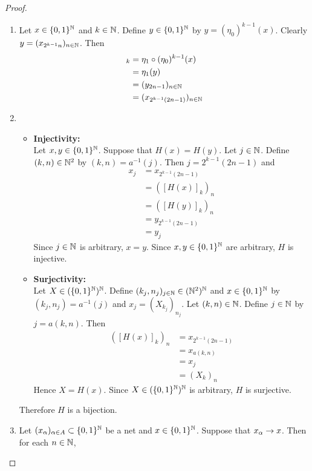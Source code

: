 \documentclass{book}
\begin{document}
	\begin{proof}\
		\begin{enumerate}
			\item Let $x \in \{0,1\}^{\mathbb{N}}$ and $k \in \mathbb{N}$. Define $y \in \{0,1\}^{\mathbb{N}}$ by $ y = (\eta_0)^{k-1}(x)$. Clearly $y = (x_{2^{k-1}n})_{n \in \mathbb{N}}$. Then 
			\begin{align*}
				[H(x)]_k
				& = \eta_1 \circ (\eta_0)^{k-1}(x) \\
				& = \eta_1(y) \\
				& = (y_{2n-1})_{n \in \N} \\
				& =  (x_{2^{k-1}(2n-1)})_{n \in \N}
			\end{align*}
			\item  
			\begin{itemize}
				\item \textbf{Injectivity:} \\
				Let $x, y \in \{0,1\}^{\mathbb{N}}$. Suppose that $H(x) = H(y)$. Let $j \in \mathbb{N}$. Define $(k,n) \in \mathbb{N}^2$ by $(k,n) = a^{-1}(j)$. Then $j = 2^{k-1}(2n-1)$ and
				\begin{align*}
					x_j
					& = x_{2^{k-1}(2n-1)} \\
					& = ([H(x)]_k)_n \\
					& = ([H(y)]_k)_n \\
					& = y_{2^{k-1}(2n-1)} \\
					& = y_j
				\end{align*}
				Since $j \in \mathbb{N}$ is arbitrary, $x = y$. Since $x,y \in \{0,1\}^{\mathbb{N}}$ are arbitrary, $H$ is injective.
				\item \textbf{Surjectivity:} \\
				Let $X \in (\{0,1\}^{\mathbb{N}})^{\mathbb{N}}$. Define $(k_j,n_j)_{j \in \mathbb{N}} \in (\mathbb{N}^2)^{\mathbb{N}}$ and $x \in \{0,1\}^{\mathbb{N}}$ by $(k_j,n_j) = a^{-1}(j)$ and $x_j = (X_{k_j})_{n_j}$. Let $(k,n) \in \mathbb{N}$. Define $j \in \mathbb{N}$ by $j = a(k,n)$. Then
				\begin{align*}
					([H(x)]_{k})_{n} 
					& = x_{2^{k-1}(2n-1)} \\
					& = x_{a(k, n)} \\
					& = x_j \\
					& = (X_{k})_{n}
				\end{align*}
				Hence $X = H(x)$. Since $X \in (\{0,1\}^{\mathbb{N}})^{\mathbb{N}}$ is arbitrary, $H$ is surjective.
			\end{itemize}
			Therefore $H$ is a bijection.
			\item Let $(x_{\alpha})_{\alpha \in A} \subset \{0,1\}^{\mathbb{N}}$ be a net and $x \in \{0,1\}^{\mathbb{N}}$. Suppose that $x_{\alpha} \rightarrow x$. Then for each $n \in \mathbb{N}$, 

\end{enumerate}
\end{proof}
\end{document}

